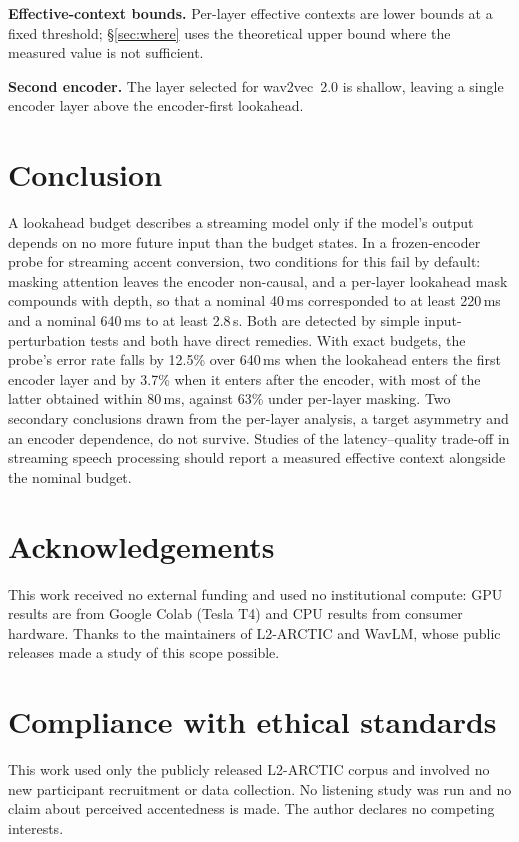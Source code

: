 \documentclass[journal]{IEEEtran}
\begin{document}
\textbf{Effective-context bounds.} Per-layer effective contexts are lower
bounds at a fixed threshold; \S\ref{sec:where} uses the theoretical upper
bound where the measured value is not sufficient.

\textbf{Second encoder.} The layer selected for wav2vec~2.0 is shallow,
leaving a single encoder layer above the encoder-first lookahead.

\section{Conclusion}

A lookahead budget describes a streaming model only if the model's output
depends on no more future input than the budget states. In a frozen-encoder
probe for streaming accent conversion, two conditions for this fail by
default: masking attention leaves the encoder non-causal, and a per-layer
lookahead mask compounds with depth, so that a nominal 40\,ms corresponded to
at least 220\,ms and a nominal 640\,ms to at least 2.8\,s. Both are detected by
simple input-perturbation tests and both have direct remedies. With exact
budgets, the probe's error rate falls by 12.5\% over 640\,ms when the
lookahead enters the first encoder layer and by 3.7\% when it enters after the
encoder, with most of the latter obtained within 80\,ms, against 63\% under
per-layer masking. Two secondary conclusions drawn from the per-layer
analysis, a target asymmetry and an encoder dependence, do not survive.
Studies of the latency--quality trade-off in streaming speech processing
should report a measured effective context alongside the nominal budget.

\section*{Acknowledgements}

This work received no external funding and used no institutional compute:
GPU results are from Google Colab (Tesla T4) and CPU results from consumer
hardware. Thanks to the maintainers of L2-ARCTIC and WavLM, whose public
releases made a study of this scope possible.

\section*{Compliance with ethical standards}

This work used only the publicly released L2-ARCTIC corpus and involved no
new participant recruitment or data collection. No listening study was run
and no claim about perceived accentedness is made. The author declares no
competing interests.



\end{document}
